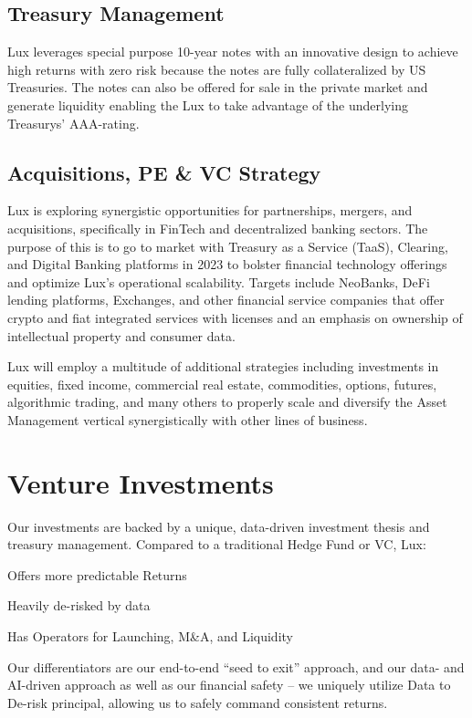 \documentclass[11pt]{article}
\begin{document}
\subsection{Treasury Management}

Lux leverages special purpose 10-year notes with an innovative design to achieve high returns with zero risk because the notes are fully collateralized by US Treasuries. The notes can also be offered for sale in the private market and generate liquidity enabling the Lux to take advantage of the underlying Treasurys' AAA-rating.


\subsection{Acquisitions, PE \& VC Strategy}

Lux is exploring synergistic opportunities for partnerships, mergers, and acquisitions, specifically in FinTech and decentralized banking sectors. The purpose of this is to go to market with Treasury as a Service (TaaS), Clearing, and Digital Banking platforms in 2023 to bolster financial technology offerings and optimize Lux's operational scalability. Targets include NeoBanks, DeFi lending platforms, Exchanges, and other financial service companies that offer crypto and fiat integrated services with licenses and an emphasis on ownership of intellectual property and consumer data.


Lux will employ a multitude of additional strategies including investments in equities, fixed income, commercial real estate, commodities, options, futures, algorithmic trading, and  many others to properly scale and diversify the Asset Management vertical synergistically with other lines of business.


\section{Venture Investments}

Our investments are backed by a unique, data-driven investment thesis and treasury management. Compared to a traditional Hedge Fund or VC, Lux:


Offers more predictable Returns


Heavily de-risked by data


Has Operators for Launching, M\&A, and Liquidity


Our differentiators are our end-to-end ``seed to exit'' approach, and our data- and AI-driven approach as well as our financial safety -- we uniquely utilize Data to De-risk principal, allowing us to safely command consistent returns.
\end{document}
